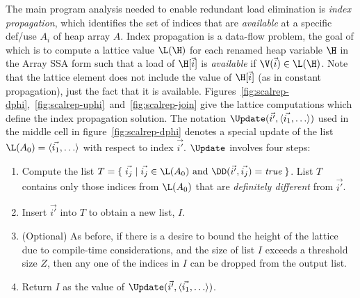 The main program analysis needed to enable redundant load elimination
is {\it index propagation},
which identifies the set of indices that
are {\em available} at a specific def/use  $A_i$ of heap array $A$.
Index propagation is a data-flow problem, the goal of which is to compute a lattice value
$\L(\H)$ for each renamed heap variable $\H$ in the Array SSA form such that a load of $\H[\vec{i}]$ is {\em available}
if $\V(\vec{i}) \in \L(\H)$.  Note that the lattice element does not include the value of $\H[\vec{i}]$ (as in constant propagation), just the fact that it is available.
Figures~\ref{fig:scalrep-dphi},~\ref{fig:scalrep-uphi}~and~\ref{fig:scalrep-join} give the lattice computations which define the index propagation solution.
The notation 
$\Update(\vec{i'},\langle \vec{i_1}, \ldots \rangle)$
used in the middle cell in 
figure~\ref{fig:scalrep-dphi} denotes a special update of 
the list $\L(A_0) = \langle \vec{i_1}, \ldots \rangle$
with respect to index $\vec{i'}$.
$\Update$ involves four steps:
\begin{enumerate}
\item Compute the list $T = \{\;\vec{i_j}\;|\;\vec{i_j}\in\L(A_0)
\mbox{~and~}\DD(\vec{i'},\vec{i_j})=\mbox{\it true}\;\}$.  List $T$
contains only those indices from $\L(A_0)$ that are
{\it definitely different} from $\vec{i'}$.

\item Insert $\vec{i'}$ into $T$ to obtain a new list, $I$.
\item (Optional) As before, if there is a desire to bound the height of the lattice due to
  compile-time considerations, and the
  size of list
$I$ exceeds a threshold size $Z$, then any one of the indices in $I$ can
be 
dropped from the output list.
\item Return $I$ as the value of 
$\Update(\vec{i'},\langle \vec{i_1}, \ldots \rangle)$.
\end{enumerate}


